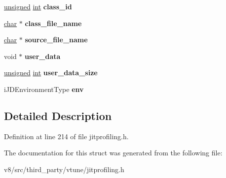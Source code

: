 \begin{DoxyCompactItemize}
\mbox{\hyperlink{classunsigned}{unsigned}} \mbox{\hyperlink{classint}{int}} {\bfseries class\+\_\+id}
\item 
\mbox{\label{struct__iJIT__Method__Load_a59e7f7b3c5dccad3d6de566b0a0edd32}} 
\mbox{\hyperlink{classchar}{char}} $\ast$ {\bfseries class\+\_\+file\+\_\+name}
\item 
\mbox{\label{struct__iJIT__Method__Load_a8dc975a3b54110af8007f2418477ac50}} 
\mbox{\hyperlink{classchar}{char}} $\ast$ {\bfseries source\+\_\+file\+\_\+name}
\item 
\mbox{\label{struct__iJIT__Method__Load_a990057599a1696b89c5e8e8bf4ad05f3}} 
void $\ast$ {\bfseries user\+\_\+data}
\item 
\mbox{\label{struct__iJIT__Method__Load_a8e116b5d71e7b98c6c85e6558d5896c6}} 
\mbox{\hyperlink{classunsigned}{unsigned}} \mbox{\hyperlink{classint}{int}} {\bfseries user\+\_\+data\+\_\+size}
\item 
\mbox{\label{struct__iJIT__Method__Load_a3ce4f9e31a87a8ef08ccc32804aebd6c}} 
i\+J\+D\+Environment\+Type {\bfseries env}
\end{DoxyCompactItemize}


\subsection{Detailed Description}


Definition at line 214 of file jitprofiling.\+h.



The documentation for this struct was generated from the following file\+:\begin{DoxyCompactItemize}
\item 
v8/src/third\+\_\+party/vtune/jitprofiling.\+h\end{DoxyCompactItemize}
